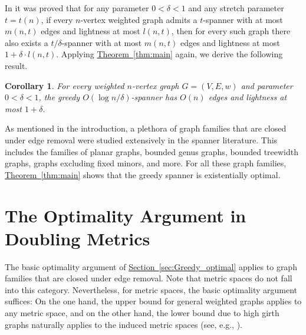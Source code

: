 \documentclass[11pt,letterpaper]{article}
\newtheorem{corollary}{Corollary}
\newcommand{\namedref}[2]{\hyperref[#2]{#1~\ref*{#2}}}
\newcommand{\sectionref}[1]{\namedref{Section}{#1}}
\newcommand{\theoremref}[1]{\namedref{Theorem}{#1}}
\begin{document}
In \cite{BFN19} it was proved that for any parameter $0<\delta<1$ and any stretch parameter $t = t(n)$,
if every  $n$-vertex weighted graph  admits a $t$-spanner with at most $m(n,t)$ edges and lightness  at most $l(n,t)$, then for every such graph
there also exists a $t/\delta$-spanner with at most $m(n,t)$ edges and lightness at most  $1+\delta\cdot l(n,t)$.
Applying \theoremref{thm:main} again, we derive the following result.
\begin{corollary}\label{cor:light_Greedy}
	For every weighted $n$-vertex graph $G = (V,E,w)$ and parameter $0<\delta<1$,
	the greedy $O(\log n/\delta)$-spanner has $O(n)$ edges and lightness at most $1+\delta$.
\end{corollary}	

As mentioned in the introduction, a plethora of graph families that are closed under edge removal were studied extensively in the spanner literature.
This includes the families of planar graphs, bounded genus graphs, bounded treewidth graphs, graphs excluding fixed minors, and more.
For all these graph families, \theoremref{thm:main} shows that the greedy spanner is existentially optimal.




\section{The Optimality Argument in Doubling Metrics}\label{sec:doubling}
The basic optimality argument of \sectionref{sec:Greedy_optimal} applies to graph families that are closed under edge removal.
Note that metric spaces do not fall into this category.
Nevertheless, for metric spaces, the basic optimality argument suffices: On the one hand, the upper bound for general weighted graphs applies to any metric space,
and on the other hand, the lower bound due to high girth graphs naturally applies to the induced metric spaces (see, e.g., \cite{ADDJS93,RR98}).
\end{document}
